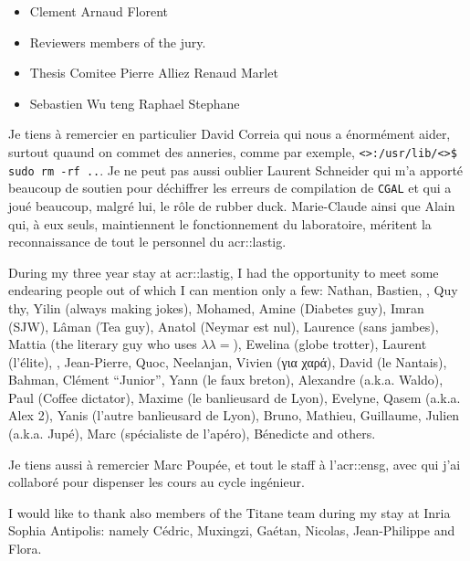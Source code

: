 \begin{itemize}
    \item Clement Arnaud Florent
    \item Reviewers members of the jury.
    \item Thesis Comitee Pierre Alliez Renaud Marlet
    \item Sebastien Wu teng Raphael Stephane
\end{itemize}

Je tiens à remercier en particulier David Correia qui nous a énormément aider, surtout quaund on commet des anneries, comme par exemple, \verb!<>:/usr/lib/<>$ sudo rm -rf ..!.
Je ne peut pas aussi oublier Laurent Schneider qui m'a apporté beaucoup de soutien pour déchiffrer les erreurs de compilation de \verb!CGAL! et qui a joué beaucoup, malgré lui, le rôle de rubber duck.
Marie-Claude ainsi que Alain qui, à eux seuls, maintiennent le fonctionnement du laboratoire, méritent la reconnaissance de tout le personnel du \acrshort*{acr::lastig}.

During my three year stay at \acrshort*{acr::lastig}, I had the opportunity to meet some endearing people out of which I can mention only a few: Nathan, Bastien, , Quy thy, Yilin (always making jokes), Mohamed, Amine (Diabetes guy), Imran (SJW), Lâman (Tea guy), Anatol (Neymar est nul), Laurence (sans jambes), Mattia (the literary guy who uses \(\lambda\lambda=\)), Ewelina (globe trotter), Laurent (l'élite), , Jean-Pierre, Quoc, Neelanjan, Vivien (για χαρά), David (le Nantais), Bahman, Clément ``Junior'', Yann (le faux breton), Alexandre (a.k.a. Waldo), Paul (Coffee dictator), Maxime (le banlieusard de Lyon), Evelyne, Qasem (a.k.a. Alex 2), Yanis (l'autre banlieusard de Lyon), Bruno, Mathieu, Guillaume, Julien (a.k.a. Jupé), Marc (spécialiste de l'apéro), Bénedicte and others.

Je tiens aussi à remercier Marc Poupée, et tout le staff à l'\acrshort*{acr::ensg}, avec qui j'ai collaboré pour dispenser les cours au cycle ingénieur.

I would like to thank also members of the Titane team during my stay at Inria Sophia Antipolis: namely Cédric, Muxingzi, Gaétan, Nicolas, Jean-Philippe and Flora.


